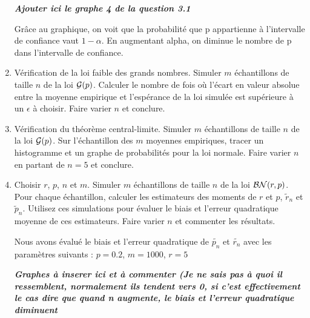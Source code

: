 \documentclass[12pt]{article}
\begin{document}
\begin{enumerate}
\textbf{\textit{Ajouter ici le graphe 4 de la question 3.1}}

Grâce au graphique, on voit que la probabilité que p appartienne à l'intervalle de confiance vaut $1-\alpha$. En augmentant alpha, on diminue le nombre de p dans l'intervalle de confiance.

\item Vérification de la loi faible des grands nombres. Simuler $m$ échantillons de taille $n$ de la loi ${\cal G}(p)$. Calculer le nombre de fois où l'écart en valeur absolue entre la moyenne empirique et l'espérance de la loi simulée est supérieure à un $\epsilon$ à choisir. Faire varier $n$ et conclure.

\vspace{3mm}

\item Vérification du théorème central-limite. Simuler $m$ échantillons de taille $n$ de la loi ${\cal G}(p)$. Sur l'échantillon des $m$ moyennes empiriques, tracer un histogramme et un graphe de probabilités pour la loi normale. Faire varier $n$ en partant de $n=5$ et conclure.

\vspace{3mm}

\item Choisir $r$, $p$, $n$ et $m$. Simuler $m$ échantillons de taille $n$ de la loi ${\cal BN}(r,p)$. Pour chaque échantillon, calculer les estimateurs des moments de $r$ et $p$, $\tilde{r}_n$ et $\tilde{p}_n$. Utilisez ces simulations pour évaluer le biais et l'erreur quadratique moyenne de ces estimateurs. Faire varier $n$ et commenter les résultats.

\vspace{5mm}
Nous avons évalué le biais et l'erreur quadratique de $\tilde{p_n}$ et $\tilde{r_n}$ avec les paramètres suivants : $p = 0.2$, $m=1000$, $r=5$

\textbf{\textit{Graphes à inserer ici et à commenter (Je ne sais pas à quoi il ressemblent, normalement ils tendent vers 0, si c'est effectivement le cas dire que quand n augmente, le biais et l'erreur quadratique diminuent}}

\end{enumerate}
\end{document}
